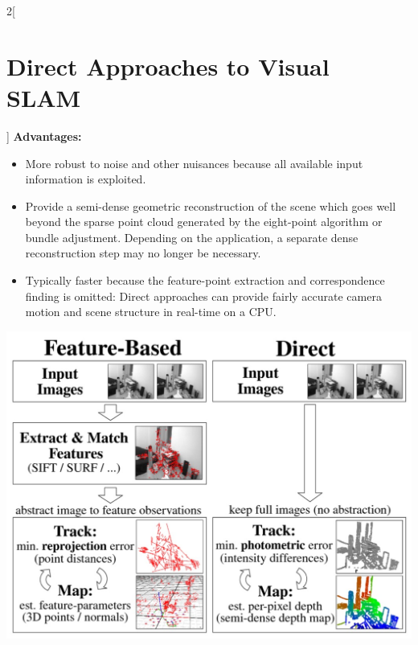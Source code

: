 \documentclass[oneside,fontsize=11pt,paper=a4]{scrartcl}
\newenvironment{myfigure}
  {\par\medskip\noindent\minipage{\linewidth}}
  {\endminipage\par\medskip}
\begin{document}
\begin{multicols}{2}[\section{Direct Approaches to Visual SLAM}]
\textbf{Advantages:}
\begin{itemize}
\item More robust to noise and other nuisances because all available input information is exploited.
\item Provide a semi-dense geometric reconstruction of the scene which goes well beyond the sparse point cloud generated by the eight-point algorithm or bundle adjustment. Depending on the application, a separate dense reconstruction step may no longer be necessary.
\item Typically faster because the feature-point extraction and correspondence finding is omitted: Direct approaches can provide fairly accurate camera motion and scene structure in real-time on a CPU.
\end{itemize}
\begin{myfigure}
 \centering
 \includegraphics[width=0.9\linewidth]{Images/Comparison_feature_based_direct.jpg}
\end{myfigure}


\end{multicols}
\end{document}
